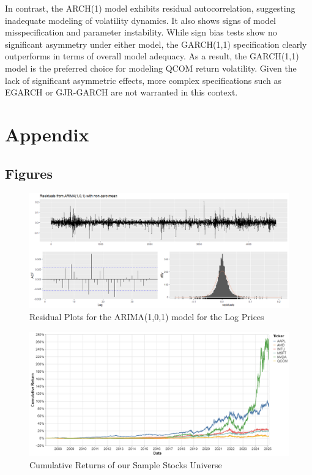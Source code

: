 \documentclass[12pt]{article}
\begin{document}
In contrast, the ARCH(1) model exhibits residual autocorrelation, suggesting inadequate modeling of volatility dynamics. It also shows signs of model misspecification and parameter instability. While sign bias tests show no significant asymmetry under either model, the GARCH(1,1) specification clearly outperforms in terms of overall model adequacy. As a result, the GARCH(1,1) model is the preferred choice for modeling QCOM return volatility. Given the lack of significant asymmetric effects, more complex specifications such as EGARCH or GJR-GARCH are not warranted in this context.

\section*{Appendix}
\begin{appendices}
\subsection*{Figures}
\begin{figure}[h]
	\centering
	\includegraphics[width=1\linewidth]{plots/residual_plot_1_1.png}
	\caption{Residual Plots for the ARIMA(1,0,1) model for the Log Prices}
	\label{fig:residual_plot_1_1}
\end{figure}

\begin{figure}[!h]
	\centering
	\includegraphics[width=0.9\linewidth]{plots/cumulative_returns.png}
	\caption{Cumulative Returns of our Sample Stocks Universe}
	\label{fig:cumulative_returns}
\end{figure}
\newpage

\end{appendices}
\end{document}
